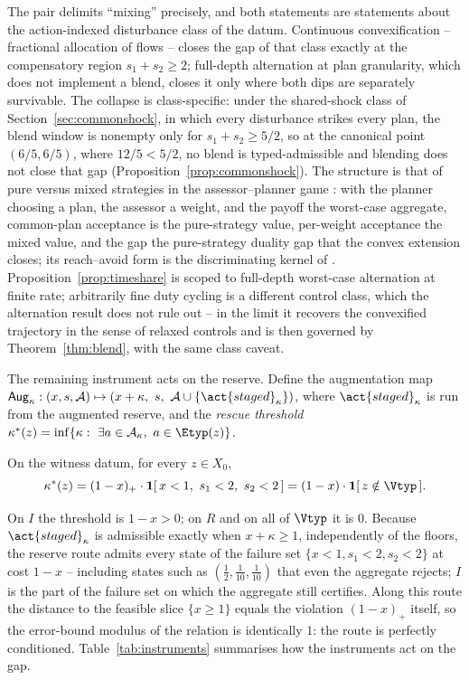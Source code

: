 The pair delimits ``mixing'' precisely, and both statements are statements about the action-indexed disturbance class of the datum. Continuous convexification -- fractional allocation of flows -- closes the gap of that class exactly at the compensatory region $s_1+s_2\ge2$; full-depth alternation at plan granularity, which does not implement a blend, closes it only where both dips are separately survivable. The collapse is class-specific: under the shared-shock class of Section~\ref{sec:commonshock}, in which every disturbance strikes every plan, the blend window is nonempty only for $s_1+s_2\ge5/2$, so at the canonical point $(6/5,6/5)$, where $12/5<5/2$, no blend is typed-admissible and blending does not close that gap (Proposition~\ref{prop:commonshock}). The structure is that of pure versus mixed strategies in the assessor--planner game \citep{vonNeumann1928,Sion1958}: with the planner choosing a plan, the assessor a weight, and the payoff the worst-case aggregate, common-plan acceptance is the pure-strategy value, per-weight acceptance the mixed value, and the gap the pure-strategy duality gap that the convex extension closes; its reach--avoid form is the discriminating kernel of \citet{Cardaliaguet1996}. Proposition~\ref{prop:timeshare} is scoped to full-depth worst-case alternation at finite rate; arbitrarily fine duty cycling is a different control class, which the alternation result does not rule out -- in the limit it recovers the convexified trajectory in the sense of relaxed controls \citep{Filippov1988,Warga1972} and is then governed by Theorem~\ref{thm:blend}, with the same class caveat.

The remaining instrument acts on the reserve. Define the augmentation map $\mathsf{Aug}_\kappa:(x,s,\mathcal A)\mapsto(x+\kappa,\ s,\ \mathcal A\cup\{\act{staged}_\kappa\})$, where $\act{staged}_\kappa$ is  run from the augmented reserve, and the \emph{rescue threshold} $\kappa^*(z)=\inf\{\kappa:\ \exists a\in\mathcal A_\kappa,\ a\in\Etyp(z)\}$.

\begin{proposition}\label{prop:rescue}
On the witness datum, for every $z\in X_0$,
\[
\kappa^*(z)=(1-x)_+\cdot\mathbf 1[\,x<1,\ s_1<2,\ s_2<2\,]=(1-x)\cdot\mathbf 1[\,z\notin\Vtyp\,].
\]
\end{proposition}

On $I$ the threshold is $1-x>0$; on $R$ and on all of $\Vtyp$ it is $0$. Because $\act{staged}_\kappa$ is admissible exactly when $x+\kappa\ge1$, independently of the floors, the reserve route admits every state of the failure set $\{x<1,s_1<2,s_2<2\}$ at cost $1-x$ -- including states such as $(\tfrac12,\tfrac1{10},\tfrac1{10})$ that even the aggregate rejects; $I$ is the part of the failure set on which the aggregate still certifies. Along this route the distance to the feasible slice $\{x\ge1\}$ equals the violation $(1-x)_+$ itself, so the error-bound modulus \citep{Fabian2010} of the relation is identically $1$: the route is perfectly conditioned. Table~\ref{tab:instruments} summarises how the instruments act on the gap.


